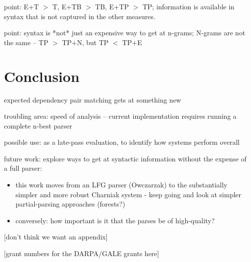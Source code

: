 \documentclass{kluwer}    %
\begin{document}
\begin{article}
point: E+T $>$ T, E+TB $>$ TB, E+TP $>$ TP; information is available in
syntax that is not captured in the other measures.

point: syntax is *not* just an expensive way to get at n-grams;
N-grams are not the same -- TP $>$ TP+N, but TP $<$ TP+E

\section{Conclusion}
\label{sec:conclusion}
expected dependency pair matching gets at something new

troubling area: speed of analysis -- current implementation requires
running a complete n-best parser

possible use: as a late-pass evaluation, to identify how systems
perform overall

future work:  explore ways to get at syntactic information without
the expense of a full parser:
\begin{itemize}
\item this work moves from an LFG parser (Owczarzak) to the
  substantially simpler and more robust Charniak system - keep going
  and look at simpler partial-parsing approaches (forests?)
\item conversely: how important is it that the parses be of
  high-quality?
\end{itemize}





\appendix

[don't think we want an appendix]


\acknowledgements

[grant numbers for the DARPA/GALE grants here]






\end{article}
\end{document}
